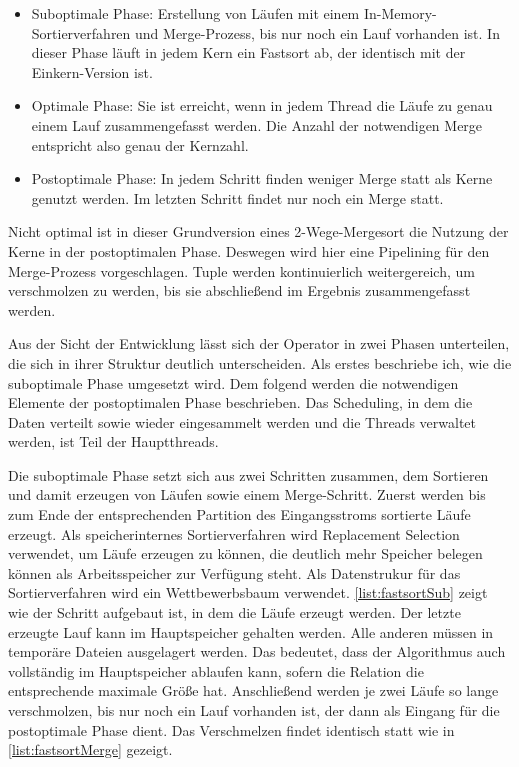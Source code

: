 \documentclass[a4paper,12pt,twoside]{article}
\begin{document}
\begin{itemize}
	\item Suboptimale Phase: Erstellung von Läufen mit einem In-Memory-Sortierverfahren und Merge-Prozess, bis nur noch ein Lauf vorhanden ist. In dieser Phase läuft in jedem Kern ein Fastsort ab, der identisch mit der Einkern-Version ist.
	\item Optimale Phase: Sie ist erreicht, wenn in jedem Thread die Läufe zu genau einem Lauf zusammengefasst werden. Die Anzahl der notwendigen Merge entspricht also genau der Kernzahl. 
	\item Postoptimale Phase: In jedem Schritt finden weniger Merge statt als Kerne genutzt werden. Im letzten Schritt findet nur noch ein Merge statt.
\end{itemize}


Nicht optimal ist in dieser Grundversion eines 2-Wege-Mergesort die Nutzung der Kerne in der postoptimalen Phase. Deswegen wird hier eine Pipelining für den Merge-Prozess vorgeschlagen. Tuple werden kontinuierlich weitergereich, um verschmolzen zu werden, bis sie abschließend im Ergebnis zusammengefasst werden. 

Aus der Sicht der Entwicklung lässt sich der Operator in zwei Phasen unterteilen, die sich in ihrer Struktur deutlich unterscheiden. Als erstes beschriebe ich, wie die suboptimale Phase umgesetzt wird. Dem folgend werden die notwendigen Elemente der postoptimalen Phase beschrieben. Das Scheduling, in dem die Daten verteilt sowie wieder eingesammelt werden und die Threads verwaltet werden, ist Teil der Hauptthreads.

Die suboptimale Phase setzt sich aus zwei Schritten zusammen, dem Sortieren und damit erzeugen von Läufen sowie einem Merge-Schritt. Zuerst werden bis zum Ende der entsprechenden Partition des Eingangsstroms sortierte Läufe erzeugt. Als speicherinternes Sortierverfahren wird Replacement Selection verwendet, um Läufe erzeugen zu können, die deutlich mehr Speicher belegen können als Arbeitsspeicher zur Verfügung steht. Als Datenstrukur für das Sortierverfahren wird ein Wettbewerbsbaum verwendet. \autoref{list:fastsortSub} zeigt wie der Schritt aufgebaut ist, in dem die Läufe erzeugt werden. Der letzte erzeugte Lauf kann im Hauptspeicher gehalten werden. Alle anderen müssen in temporäre Dateien ausgelagert werden. Das bedeutet, dass der Algorithmus auch vollständig im Hauptspeicher ablaufen kann, sofern die Relation die entsprechende maximale Größe hat. Anschließend werden je zwei Läufe so lange verschmolzen, bis nur noch ein Lauf vorhanden ist, der dann als Eingang für die postoptimale Phase dient. Das Verschmelzen findet identisch statt wie in  \autoref{list:fastsortMerge} gezeigt.
\end{document}
